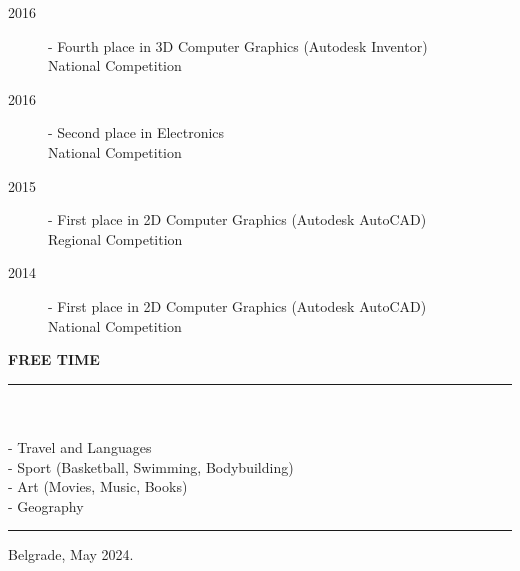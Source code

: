 \documentclass{article}
\begin{document}
\begin{description}
	\item[ 2016] - Fourth place in 3D Computer Graphics (Autodesk Inventor)\\
	National Competition
	\item[ 2016] - Second place in Electronics\\
	National Competition
	\item[ 2015] - First place in 2D Computer Graphics (Autodesk AutoCAD)\\
	Regional Competition
	\item[ 2014] - First place in 2D Computer Graphics (Autodesk AutoCAD)\\
	National Competition
\end{description}

\color{my_col}
\textbf{\large FREE TIME }\\
\noindent\rule{15.4cm}{1.6pt}\color{black}\\\\
- Travel and Languages\\
- Sport (Basketball, Swimming, Bodybuilding) \\
- Art (Movies, Music, Books)\\
- Geography\\

\color{my_col}\noindent\rule{15.4cm}{1.6pt}\color{black}
\begin{flushright}
	\small Belgrade, May 2024.
\end{flushright}
\end{document}
